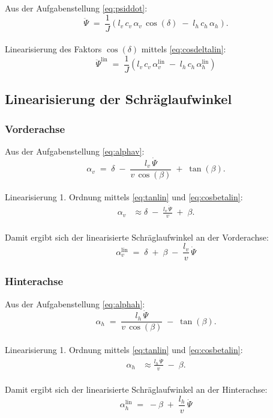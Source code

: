 Aus der Aufgabenstellung \eqref{eq:psiddot}:
\begin{equation*}
\ddot{\Psi} \;=\; \frac{1}{J}
\left(
l_v\,c_v\,\alpha_v\,\cos(\delta)
\;-\;
l_h\,c_h\,\alpha_h
\right).
\end{equation*}
\\
Linearisierung des Faktors $\cos(\delta)$ mittels \eqref{eq:cosdeltalin}:
\begin{equation}
\boxed{
\ddot{\Psi}^{\mathrm{lin}}
\;=\;
\frac{1}{J}
\left(
l_v\,c_v\,\alpha_v^{\mathrm{lin}}
\;-\;
l_h\,c_h\,\alpha_h^{\mathrm{lin}}
\right)
}
\end{equation}
\subsection{Linearisierung der Schräglaufwinkel}

\subsubsection{Vorderachse}
Aus der Aufgabenstellung \eqref{eq:alphav}:
\begin{equation*}
\alpha_v \;=\; \delta \;-\;\frac{l_v\,\dot{\Psi}}{v\,\cos(\beta)}\;+\;\tan(\beta).
\end{equation*}
\\
Linearisierung 1. Ordnung mittels \eqref{eq:tanlin} und \eqref{eq:cosbetalin}:
\begin{align*}
\alpha_v
&\approx \delta \;-\;\frac{l_v\,\dot{\Psi}}{v}\;+\;\beta.
\end{align*}
\\
Damit ergibt sich der linearisierte Schräglaufwinkel an der Vorderachse:
\begin{equation}
\boxed{\alpha_v^{\mathrm{lin}} \;=\; \delta \;+\;\beta \;-\;\frac{l_v}{v}\,\dot{\Psi}}
\end{equation}

\subsubsection{Hinterachse}
Aus der Aufgabenstellung \eqref{eq:alphah}:
\begin{equation*}
\alpha_h \;=\; \frac{l_h\,\dot{\Psi}}{v\,\cos(\beta)}\;-\;\tan(\beta).
\end{equation*}
\\
Linearisierung 1. Ordnung mittels \eqref{eq:tanlin} und \eqref{eq:cosbetalin}:
\begin{align*}
\alpha_h
&\approx \frac{l_h\,\dot{\Psi}}{v}\;-\;\beta.
\end{align*}
\\
Damit ergibt sich der linearisierte Schräglaufwinkel an der Hinterachse:
\begin{equation}
\boxed{\alpha_h^{\mathrm{lin}} \;=\; -\beta \;+\;\frac{l_h}{v}\,\dot{\Psi}}
\end{equation}

